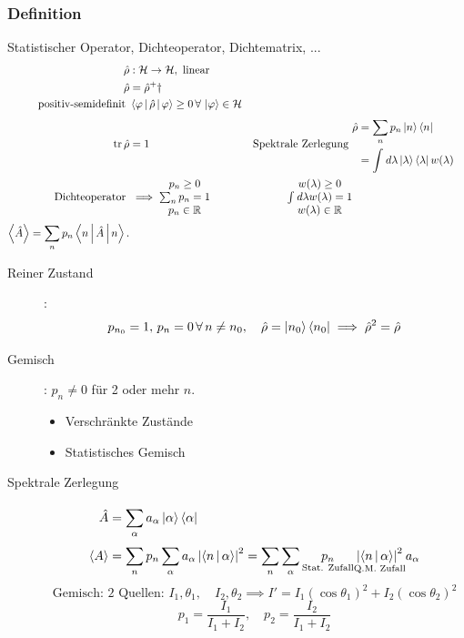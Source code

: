 \subsubsection*{Definition}
Statistischer Operator, Dichteoperator, Dichtematrix, ...
\begin{align*}
  \hat{\rho} & : \mathcal{H} \to  \mathcal{H}, \text{ linear } \\
  \hat{\rho} & = \hat{\rho}^+\dagger \\
  \text{positiv-semidefinit } & \Braket{\varphi | \hat{\rho}| \varphi} \ge 0 \,\forall\,\Ket{\varphi} \in \mathcal{ H} \\
  \operatorname{tr} \hat{\rho } & =1  &
  \text{Spektrale Zerlegung } & \begin{split}
  \hat{\rho} &=  \sum_{n}^{} p_n \Ket{n}\Bra{n} \\ &= \int_{}^{} d \lambda \Ket{\lambda}\Bra{\lambda} w(\lambda) 
  \end{split}
   \\
  \text{Dichteoperator } & \implies \begin{matrix} p_n \ge 0 \\ \sum_{n}^{} p_n =1 \\
p_n \in \mathbb{R} \end{matrix} 
&
\begin{matrix} 
  w(\lambda )\ge 0 \\ \int_{}^{} d \lambda w( \lambda )=1 \\ w(\lambda) \in \mathbb{R} 
\end{matrix} \\
  \Braket{\hat{A}}= \sum_{n}^{}p_n \Braket{n|\hat{A}|n}.
\end{align*}
\begin{description}
  \item[Reiner Zustand]: \[ p_{n_0}=1,\, p_n =0 \,\forall\, n \neq n_0, \quad  \hat{\rho}= \Ket{n_0}\Bra{n_0} \implies \hat{\rho}^2=\hat{\rho} \]  
  \item[Gemisch]: $p_n \neq 0 $ f\"ur 2 oder mehr $n$.
    \begin{itemize}
      \item Verschr\"ankte Zust\"ande
      \item Statistisches Gemisch
    \end{itemize}
  \item[Spektrale Zerlegung] \begin{align*}
    \hat{A} &= \sum_{\alpha}^{}a_ \alpha \Ket{\alpha}\Bra{\alpha} \\
    \Braket{A}&= \sum_{n}^{}p_n \sum_{\alpha}^{}a_ \alpha \left| \Braket{n|\alpha} \right|^2
    = \sum_{n}^{}\sum_{\alpha}^{} \underset{\text{Stat. Zufall}}{p_n} \underset{\text{Q.M. Zufall}}{\left| \Braket{n|\alpha} \right|^2} a_ \alpha
  \end{align*}
  \[ \text{Gemisch: 2 Quellen: } I_1, \theta_1, \quad I_2, \theta_2 \implies 
  I'= I_1 ( \cos{\theta_1})^2 + I_2 (\cos{\theta_2})^2 \] 
  \[ p_1 = \frac{I_1}{I_1 + I_2}, \quad p_2 = \frac{I_2}{I_1 + I_2} \] 
\end{description}
